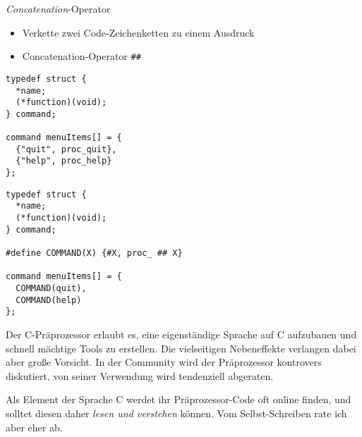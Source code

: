
\begin{frame}[fragile]{\emph{Concatenation}-Operator}
%
\begin{itemize}
\item Verkette zwei Code-Zeichenketten zu einem Ausdruck
\item Concatenation-Operator \texttt{\#\#}
\end{itemize}
%
%
\begin{codebox}
\begin{verbatim}
typedef struct {
  *name; 
  (*function)(void);
} command;

command menuItems[] = {
  {"quit", proc_quit},
  {"help", proc_help}
};
\end{verbatim}
\end{codebox}
%
\begin{codebox}
\begin{verbatim}
typedef struct {
  *name; 
  (*function)(void);
} command;

#define COMMAND(X) {#X, proc_ ## X}

command menuItems[] = {
  COMMAND(quit),
  COMMAND(help)
};
\end{verbatim}
\end{codebox}
%
\end{frame}


\begin{frame}
%
\begin{hintbox}
Der C-Präprozessor erlaubt es, eine eigenständige Sprache auf C aufzubauen und schnell mächtige Tools zu erstellen. Die vielseitigen Nebeneffekte verlangen dabei aber große Vorsicht. In der Community wird der Präprozessor kontrovers diskutiert, von seiner Verwendung wird tendenziell abgeraten.

\vspace{6pt}
Als Element der Sprache C werdet ihr Präprozessor-Code oft online finden, und solltet diesen daher \emph{lesen und verstehen} können. Vom Selbst-Schreiben rate ich aber eher ab.
\end{hintbox}
%
\end{frame}

